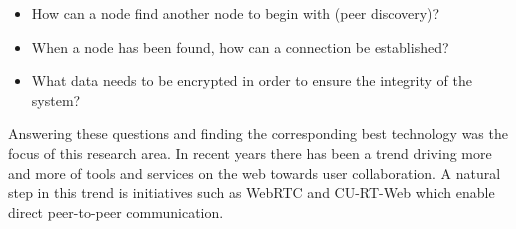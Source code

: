 \begin{itemize}
\item How can a node find another node to begin with (peer discovery)?
\item When a node has been found, how can a connection be established?
\item What data needs to be encrypted in order to ensure the integrity of the system?
\end{itemize}

Answering these questions and finding the corresponding best technology was the focus of this research area. In recent years there has been a trend driving more and more of tools and services on the web towards user collaboration. A natural step in this trend is initiatives such as WebRTC and CU-RT-Web which enable direct peer-to-peer communication.
